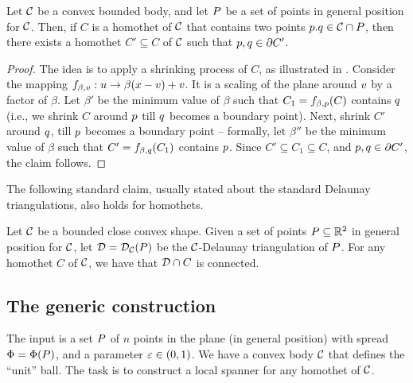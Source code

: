 \documentclass[12pt]{article}%
\begin{document}
\begin{lemma}
    Let $\mathcal{C}$ be a convex bounded body, and let $P$ be a set of
    points in general position for $\mathcal{C}$. Then, if $C$ is a homothet
    of $\mathcal{C}$ that contains two points $p. q \in \mathcal{C} \cap P$,
    then there exists a homothet $C' \subseteq C$ of $\mathcal{C}$ such that
    $p, q \in \partial C'$.
\end{lemma}
\begin{proof}
    The idea is to apply a shrinking process of $C$, as illustrated in
    .  Consider the mapping
    $f_{\beta, v} : u \rightarrow \beta (x - v) + v $. It is
    a scaling of the plane around $v$ by a factor of $\beta$. Let
    $\beta'$ be the minimum value of $\beta$ such that
    $C_1 = f_{\beta,p}(C)$ contains $q$ (i.e., we shrink $C$
    around $p$ till $q$ becomes a boundary point). Next, shrink
    $C'$ around $q$, till $p$ becomes a boundary point --
    formally, let $\beta''$ be the minimum value of $\beta$ such that
    $C' = f_{\beta,q}(C_1)$ contains $p$. Since
    $C' \subseteq C_1 \subseteq C$, and $p, q \in \partial C'$,
    the claim follows.
\end{proof}

The following standard claim, usually stated about the standard
Delaunay triangulations, also holds for homothets.

\SaveContent{\ClaimDelConnected}%
{%
   Let $\mathcal{C}$ be a bounded close convex shape.  Given a set of points
   $P \subseteq \mathbb{R}^2$ in general position for $\mathcal{C}$, let
   $\mathcal{D} = \mathcal{D}_{\mathcal{C}}(P)$ be the $\mathcal{C}$-Delaunay triangulation of
   $P$. For any homothet $C$ of $\mathcal{C}$, we have that
   $\mathcal{D} \cap {C}$ is connected.%
}

\medskip%
\begin{claim}
    \ClaimDelConnected{}
\end{claim}



 



\subsection{The generic construction}

The input is a set $P$ of $n$ points in the plane (in general
position) with spread $\spread = \spreadX{\PS}$, and a parameter
$\varepsilon \in (0,1)$. We have a convex body $\mathcal{C}$ that defines the
``unit'' ball. The task is to construct a local spanner for any
homothet of $\mathcal{C}$.
\end{document}
